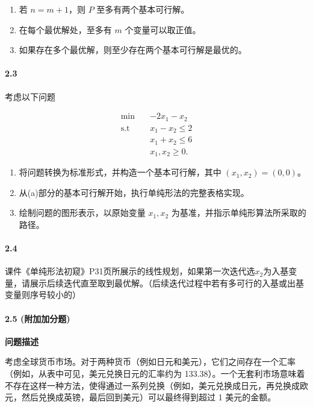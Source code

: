 \documentclass[12pt,a4paper]{article}
\begin{document}
\begin{enumerate}
    \item[(a)] 若 \( n = m + 1 \)，则 \( P \) 至多有两个基本可行解。
    \item[(b)] 在每个最优解处，至多有 \( m \) 个变量可以取正值。
    \item[(c)] 如果存在多个最优解，则至少存在两个基本可行解是最优的。
\end{enumerate}

\paragraph{2.3}
考虑以下问题

\begin{align*}
 \min \quad & -2x_1 - x_2 \\
\text{s.t} \quad & x_1 - x_2 \leq 2 \\
& x_1 + x_2 \leq 6 \\
& x_1, x_2 \geq 0.
\end{align*}


\begin{enumerate}
    \item[a)] 将问题转换为标准形式，并构造一个基本可行解，其中 \((x_1, x_2) = (0, 0)\)。
    \item[b)] 从(a)部分的基本可行解开始，执行单纯形法的完整表格实现。
    \item[c)] 绘制问题的图形表示，以原始变量 \(x_1, x_2\) 为基准，并指示单纯形算法所采取的路径。
\end{enumerate}


\paragraph{2.4}
课件《单纯形法初窥》P31页所展示的线性规划，如果第一次迭代选$x_2$为入基变量，请展示后续迭代直至取到最优解。（后续迭代过程中若有多可行的入基或出基变量则序号较小的）



\paragraph{2.5 (附加加分题)} 
\textbf{问题描述}

考虑全球货币市场。对于两种货币（例如日元和美元），它们之间存在一个汇率（例如，从表中可见，美元兑换日元的汇率约为 133.38）。一个无套利市场意味着不存在这样一种方法，使得通过一系列兑换（例如，美元兑换成日元，再兑换成欧元，然后兑换成英镑，最后回到美元）可以最终得到超过 1 美元的金额。
\end{document}

